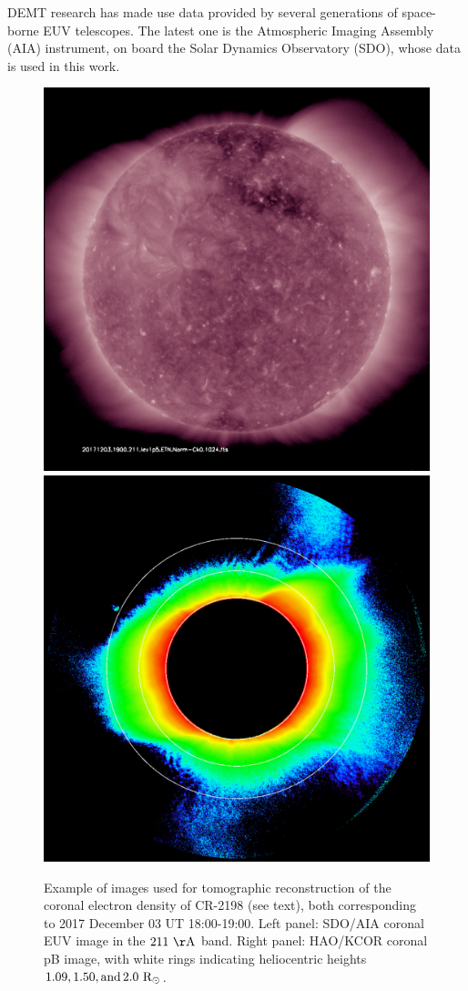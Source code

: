 \documentclass[baaa]{baaa}
\begin{document}
DEMT research has made use  data provided by several generations of space-borne EUV telescopes. The latest one is the Atmospheric Imaging Assembly (AIA) instrument, on board the Solar Dynamics Observatory (SDO), whose data is used in this work.

\begin{figure}[h]
  \centering
  \includegraphics[width=0.7\columnwidth]{img_211.pdf}
  \hskip 1cm
  \includegraphics[width=0.7\columnwidth]{20171203_180316_kcor_l1_10min_avg_image.pdf}
  \caption{Example of images used for tomographic reconstruction of the coronal electron density of CR-2198 (see text), both corresponding to 2017 December 03 UT 18:00-19:00. Left panel: SDO/AIA coronal EUV image in the $211~\rm{\AA}$ band. Right panel: HAO/KCOR coronal pB image, with white rings indicating heliocentric heights $1.09, 1.50, \rm{and}\, 2.0~\rm{R}_\odot$.}
  \label{fig_images}
\end{figure}
\end{document}
